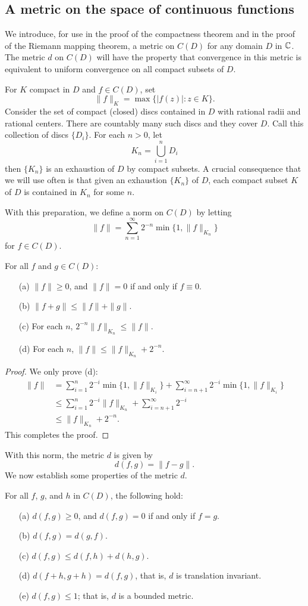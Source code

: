 \subsection{A metric on the space of continuous functions}
We introduce, for use in the proof of the compactness theorem and in the proof of the Riemann mapping theorem, a metric on $C(D)$ for any domain $D$ in $\mathbb{C}$. The metric $d$ on $C(D)$ will have the property that convergence in this metric is equivalent to uniform convergence on all compact subsets of $D$.\par
For $K$ compact in $D$ and $f\in C(D)$, set
\[\|f\|_K=\max\{|f(z)|:z\in K\}.\]
Consider the set of compact (closed) discs contained in $D$ with rational radii and rational centers. There are countably many such discs and they cover $D$. Call this collection of discs $\{D_i\}$. For each $n>0$, let
\[K_n=\bigcup_{i=1}^{n}D_i\]
then $\{K_n\}$ is an exhaustion of $D$ by compact subsets. A crucial consequence that we will use often is that given an exhaustion $\{K_n\}$ of $D$, each compact subset $K$ of $D$ is contained in $K_n$ for some $n$.\par
With this preparation, we define a norm on $C(D)$ by letting
\[\|f\|=\sum_{n=1}^{\infty}2^{-n}\min\{1,\|f\|_{K_n}\}\]
for $f\in C(D)$.
\begin{lemma}\label{property of norm on C(D)}
For all $f$ and $g\in C(D)$:
\begin{itemize}
\item[(a)] $\|f\|\geq 0$, and $\|f\|=0$ if and only if $f\equiv 0$.
\item[(b)] $\|f+g\|\leq\|f\|+\|g\|$.
\item[(c)] For each $n$, $2^{-n}\|f\|_{K_n}\leq \|f\|$.
\item[(d)] For each $n$, $\|f\|\leq \|f\|_{K_n}+2^{-n}$.
\end{itemize}
\end{lemma}
\begin{proof}
We only prove (d):
\begin{align*}
\|f\|&=\sum_{i=1}^{n}2^{-i}\min\{1,\|f\|_{K_i}\}+\sum_{i=n+1}^{\infty}2^{-i}\min\{1,\|f\|_{K_i}\}\\
&\leq\sum_{i=1}^{n}2^{-i}\|f\|_{K_n}+\sum_{i=n+1}^{\infty}2^{-i}\\
&\leq\|f\|_{K_n}+2^{-n}.
\end{align*}
This completes the proof.
\end{proof}
With this norm, the metric $d$ is given by
\[d(f,g)=\|f-g\|.\]
We now establish some properties of the metric $d$.
\begin{lemma}
For all $f$, $g$, and $h$ in $C(D)$, the following hold:
\begin{itemize}
\item[(a)] $d(f,g)\geq 0$, and $d(f,g)=0$ if and only if $f=g$.
\item[(b)] $d(f,g)=d(g,f)$.
\item[(c)] $d(f,g)\leq d(f,h)+d(h,g)$.
\item[(d)] $d(f+h,g+h)=d(f,g)$, that is, $d$ is translation invariant.
\item[(e)] $d(f,g)\leq 1$; that is, $d$ is a bounded metric.
\end{itemize}
\end{lemma}

